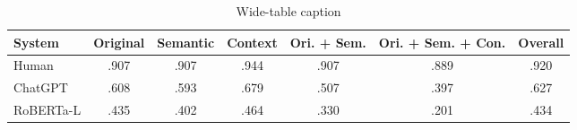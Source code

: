 

\begin{table*}
	\caption{Wide-table caption}
	\label{tab:results-table}
	\begin{center}
		\begin{tabular}{lcccccc}
			\toprule
			\textbf{System}       & \textbf{Original} & \textbf{Semantic} & \textbf{Context} & \textbf{Ori. + Sem.} & \textbf{Ori. + Sem. + Con.} & \textbf{Overall} \\
			\midrule
			\color{gray}Human     & \color{gray}.907  & \color{gray}.907  & \color{gray}.944 & \color{gray}.907     & \color{gray}.889            & \color{gray}.920 \\
			\color{gray}ChatGPT   & \color{gray}.608  & \color{gray}.593  & \color{gray}.679 & \color{gray}.507     & \color{gray}.397            & \color{gray}.627 \\
			\color{gray}RoBERTa-L & \color{gray}.435  & \color{gray}.402  & \color{gray}.464 & \color{gray}.330     & \color{gray}.201            & \color{gray}.434 \\
			\midrule
			\bottomrule
		\end{tabular}
	\end{center}
\end{table*}
